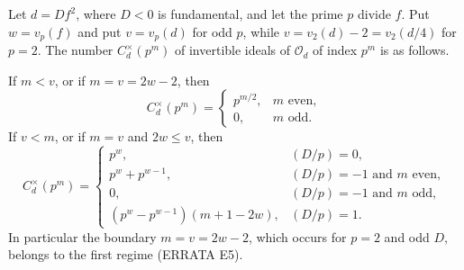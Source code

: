 
\begin{corollary}\label{cor-3-1-3}
Let $d=Df^2$, where $D<0$ is fundamental, and let the prime $p$ divide $f$.
Put $w=v_p(f)$ and put $v=v_p(d)$ for odd $p$, while
$v=v_2(d)-2=v_2(d/4)$ for $p=2$.  The number $C_d^\times(p^m)$ of invertible
ideals of $\mathcal O_d$ of index $p^m$ is as follows.

If $m<v$, or if $m=v=2w-2$, then
\[
C_d^\times(p^m)=
\begin{cases}p^{m/2},&m\text{ even},\\0,&m\text{ odd}.
\end{cases}
\]
If $v<m$, or if $m=v$ and $2w\leq v$, then
\[
C_d^\times(p^m)=
\begin{cases}
p^w,&(D/p)=0,\\
p^w+p^{w-1},&(D/p)=-1\text{ and }m\text{ even},\\
0,&(D/p)=-1\text{ and }m\text{ odd},\\
(p^w-p^{w-1})(m+1-2w),&(D/p)=1.
\end{cases}
\]
In particular the boundary $m=v=2w-2$, which occurs for $p=2$ and odd $D$,
belongs to the first regime (ERRATA E5).
\end{corollary}

